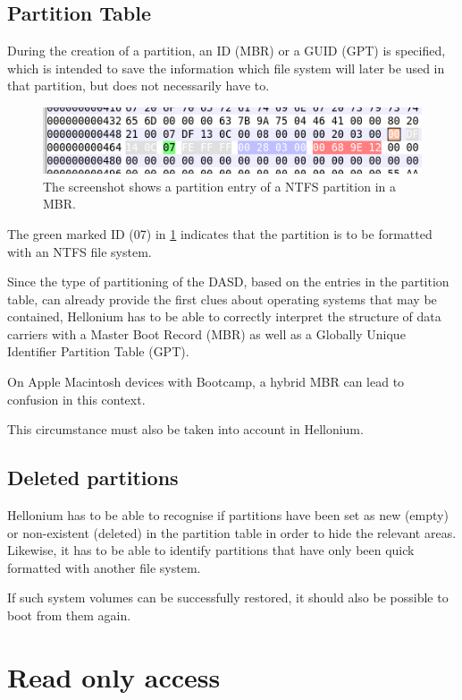 \subsection{Partition Table}

During the creation of a partition, an ID (MBR) or a GUID (GPT) is specified, which is intended to save the information which file system will later be used in that partition, but does not necessarily have to.

\begin{figure}[htbp]  %
  \centering
  \includegraphics[width=.5\textwidth]{figures/wxhexeditor-mbr-ntfs.png}
  \caption[NTFS partition entry in MBR]{The screenshot shows a partition entry of a NTFS partition in a MBR.}
  \label{fig:NTFSMBR}
\end{figure}

The green marked ID (07) in \cref{fig:NTFSMBR} indicates that the partition is to be formatted with an NTFS file system.

Since the type of partitioning of the DASD, based on the entries in the partition table, can already provide the first clues about operating systems that may be contained, Hellonium has to be able to correctly interpret the structure of data carriers with a Master Boot Record (MBR) as well as a Globally Unique Identifier Partition Table (GPT).

On Apple Macintosh devices with Bootcamp, a hybrid MBR can lead to confusion in this context. \cite{HybridMBR}

This circumstance must also be taken into account in Hellonium.

\subsection{Deleted partitions}

Hellonium has to be able to recognise if partitions have been set as new (empty) or non-existent (deleted) in the partition table in order to hide the relevant areas. Likewise, it has to be able to identify partitions that have only been quick formatted with another file system.

If such system volumes can be successfully restored, it should also be possible to boot from them again.

\section{Read only access}
\label{sec:readonly}

